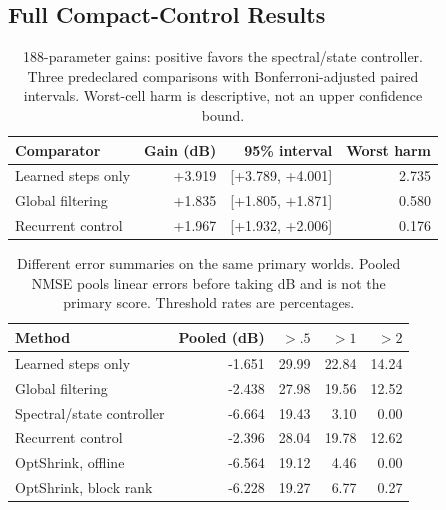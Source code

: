 \subsection{Full Compact-Control Results}



\begin{table}[!t]
\caption{188-parameter gains: positive favors the spectral/state controller. Three predeclared comparisons with Bonferroni-adjusted paired intervals. Worst-cell harm is descriptive, not an upper confidence bound.}
\label{tab:compact-contrasts}\centering\footnotesize
\setlength{\tabcolsep}{3pt}
\begin{tabular}{@{}lrrr@{}}\toprule
Comparator & Gain (dB) & 95\% interval & Worst harm\\
\midrule
Learned steps only & +3.919 & [+3.789, +4.001] & 2.735\\
Global filtering & +1.835 & [+1.805, +1.871] & 0.580\\
Recurrent control & +1.967 & [+1.932, +2.006] & 0.176\\
\bottomrule
\end{tabular}
\end{table}


\begin{table}[!t]
\caption{Different error summaries on the same primary worlds. Pooled NMSE pools linear errors before taking dB and is not the primary score. Threshold rates are percentages.}
\label{tab:compact-tails}\centering\footnotesize
\setlength{\tabcolsep}{3pt}
\begin{tabular}{@{}lrrrr@{}}\toprule
Method & Pooled (dB) & $>.5$ & $>1$ & $>2$\\
\midrule
Learned steps only & -1.651 & 29.99 & 22.84 & 14.24\\
Global filtering & -2.438 & 27.98 & 19.56 & 12.52\\
Spectral/state controller & -6.664 & 19.43 & 3.10 & 0.00\\
Recurrent control & -2.396 & 28.04 & 19.78 & 12.62\\
OptShrink, offline & -6.564 & 19.12 & 4.46 & 0.00\\
OptShrink, block rank & -6.228 & 19.27 & 6.77 & 0.27\\
\bottomrule
\end{tabular}
\end{table}


